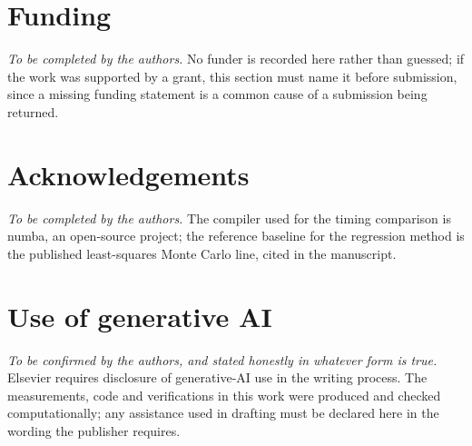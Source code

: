 \documentclass[11pt]{article}
\begin{document}
\section*{Funding}

\emph{To be completed by the authors.} No funder is recorded here rather than guessed; if the work
was supported by a grant, this section must name it before submission, since a missing funding
statement is a common cause of a submission being returned.

\section*{Acknowledgements}

\emph{To be completed by the authors.} The compiler used for the timing comparison is numba, an
open-source project; the reference baseline for the regression method is the published
least-squares Monte Carlo line, cited in the manuscript.

\section*{Use of generative AI}

\emph{To be confirmed by the authors, and stated honestly in whatever form is true.} Elsevier requires
disclosure of generative-AI use in the writing process. The measurements, code and verifications in
this work were produced and checked computationally; any assistance used in drafting must be declared
here in the wording the publisher requires.
\end{document}
